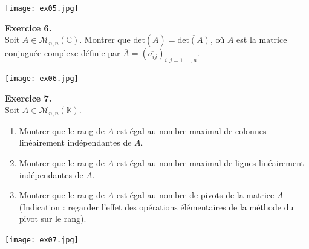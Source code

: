 \documentclass[a4paper, 10pt]{report}
\begin{document}
	\texttt{[image: ex05.jpg]}
	
	\newpage
	
	\noindent
	\textbf{Exercice 6.}\\
	Soit $A \in \mathcal{M}_{n, n}(\mathbb{C})$. Montrer que
	$\mathrm{det}(\overline{A}) = \overline{\mathrm{det}({A})}$, où
	$\overline{A}$ est la matrice conjuguée complexe définie par
	$\overline{A} = (\overline{a_{ij}})_{i, j = 1, \dotsc, n}$.
	
	\texttt{[image: ex06.jpg]}
	
	\vspace{5mm}
	\noindent
	\textbf{Exercice 7.}\\
	Soit $A \in \mathcal{M}_{n, n}(\mathbb{K})$.
	\begin{enumerate}[label=\arabic*., leftmargin=7mm]
		\item Montrer que le rang de $A$ est égal au nombre maximal
		de colonnes linéairement indépendantes de $A$.
		\item Montrer que le rang de $A$ est égal au nombre maximal
		de lignes linéairement indépendantes de $A$.
		\item Montrer que le rang de $A$ est égal au nombre de pivots
		de la matrice $A$ (Indication : regarder l'effet des opérations
		élémentaires de la méthode du pivot sur le rang).
	\end{enumerate}
	
	\texttt{[image: ex07.jpg]}

	
%	
%	
	
\end{document}
